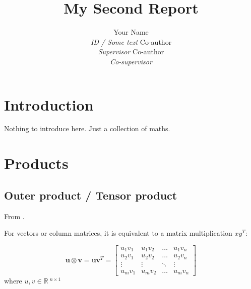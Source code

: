 \documentclass{article}
\title{My Second Report}
\author{Your Name \\ \textit{ID / Some text}  \AND
        Co-author \\ \textit{Supervisor}      \AND
        Co-author \\ \textit{Co-supervisor}}
\begin{document}
\maketitle

\tableofcontents
\listoffigures
\listoftables
\clearpage



\section{Introduction}
\label{sec: Introduction}

Nothing to introduce here. Just a collection of maths.





\section{Products}
\label{sec: Products}


\subsection[Outer product]{Outer product / Tensor product}
\label{subsec: Outer product}

From \cite{wiki2019outerProd}.

For vectors or column matrices, it is equivalent to a matrix multiplication $x y^{T}$:

\begin{equation}
    \mathbf{u} \otimes \mathbf{v} = \mathbf{u} \mathbf{v}^{T} = \left[ \begin{array}{cccc}{u_{1} v_{1}} & {u_{1} v_{2}} & {\ldots} & {u_{1} v_{n}} \\ {u_{2} v_{1}} & {u_{2} v_{2}} & {\dots} & {u_{2} v_{n}} \\ {\vdots} & {\vdots} & {\ddots} & {\vdots} \\ {u_{m} v_{1}} & {u_{m} v_{2}} & {\ldots} & {u_{m} v_{n}}\end{array}\right]
\end{equation}
\noindent
where $u, v \in\mathbb{R}\:^{n \times 1}$
\end{document}

